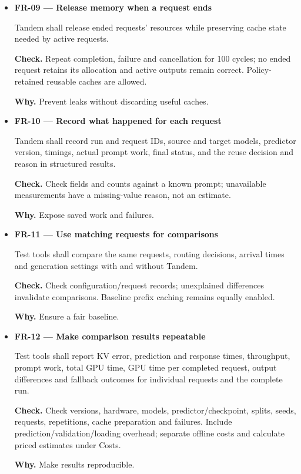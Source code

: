 \documentclass[12pt]{article}
\begin{document}
\begin{itemize}
\item {}\label{req:FR-09}
\textbf{FR-09 --- Release memory when a request ends}\par
Tandem shall release ended requests' resources while preserving cache state needed by active requests.\par
\textbf{Check.} Repeat completion, failure and cancellation for 100 cycles; no ended request retains its allocation and active outputs remain correct. Policy-retained reusable caches are allowed.\par
\textbf{Why.} Prevent leaks without discarding useful caches.


\item {}\label{req:FR-10}
\textbf{FR-10 --- Record what happened for each request}\par
Tandem shall record run and request IDs, source and target models, predictor version, timings, actual prompt work, final status, and the reuse decision and reason in structured results.\par
\textbf{Check.} Check fields and counts against a known prompt; unavailable measurements have a missing-value reason, not an estimate.\par
\textbf{Why.} Expose saved work and failures.


\item {}\label{req:FR-11}
\textbf{FR-11 --- Use matching requests for comparisons}\par
Test tools shall compare the same requests, routing decisions, arrival times and generation settings with and without Tandem.\par
\textbf{Check.} Check configuration/request records; unexplained differences invalidate comparisons. Baseline prefix caching remains equally enabled.\par
\textbf{Why.} Ensure a fair baseline.


\item {}\label{req:FR-12}
\textbf{FR-12 --- Make comparison results repeatable}\par
Test tools shall report KV error, prediction and response times, throughput, prompt work, total GPU time, GPU time per completed request, output differences and fallback outcomes for individual requests and the complete run.\par
\textbf{Check.} Check versions, hardware, models, predictor/checkpoint, splits, seeds, requests, repetitions, cache preparation and failures. Include prediction/validation/loading overhead; separate offline costs and calculate priced estimates under Costs.\par
\textbf{Why.} Make results reproducible.



\end{itemize}
\end{document}

